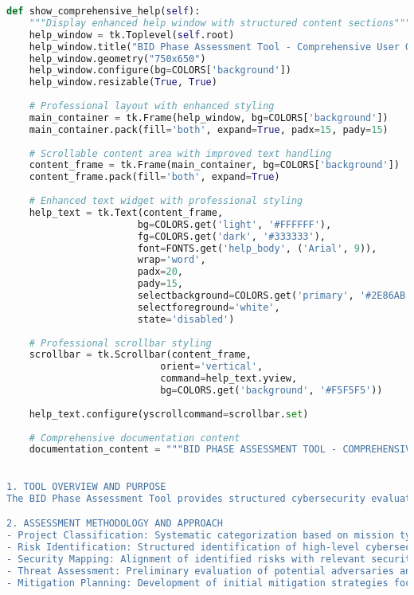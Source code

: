 \documentclass[binding=0.6cm]{sapthesis}
\begin{document}
\begin{lstlisting}[language=Python, caption=BID Tool Enhanced Help System Implementation]
def show_comprehensive_help(self):
    """Display enhanced help window with structured content sections"""
    help_window = tk.Toplevel(self.root)
    help_window.title("BID Phase Assessment Tool - Comprehensive User Guide")
    help_window.geometry("750x650")
    help_window.configure(bg=COLORS['background'])
    help_window.resizable(True, True)
    
    # Professional layout with enhanced styling
    main_container = tk.Frame(help_window, bg=COLORS['background'])
    main_container.pack(fill='both', expand=True, padx=15, pady=15)
    
    # Scrollable content area with improved text handling
    content_frame = tk.Frame(main_container, bg=COLORS['background'])
    content_frame.pack(fill='both', expand=True)
    
    # Enhanced text widget with professional styling
    help_text = tk.Text(content_frame,
                       bg=COLORS.get('light', '#FFFFFF'),
                       fg=COLORS.get('dark', '#333333'),
                       font=FONTS.get('help_body', ('Arial', 9)),
                       wrap='word',
                       padx=20,
                       pady=15,
                       selectbackground=COLORS.get('primary', '#2E86AB'),
                       selectforeground='white',
                       state='disabled')
    
    # Professional scrollbar styling
    scrollbar = tk.Scrollbar(content_frame,
                           orient='vertical',
                           command=help_text.yview,
                           bg=COLORS.get('background', '#F5F5F5'))
    
    help_text.configure(yscrollcommand=scrollbar.set)
    
    # Comprehensive documentation content
    documentation_content = """BID PHASE ASSESSMENT TOOL - COMPREHENSIVE USER GUIDE
    

1. TOOL OVERVIEW AND PURPOSE
The BID Phase Assessment Tool provides structured cybersecurity evaluation during the Business Initiation and Definition phase of space projects. It enables early identification of security risks and integration of cybersecurity considerations into project planning from the initial stages.

2. ASSESSMENT METHODOLOGY AND APPROACH  
- Project Classification: Systematic categorization based on mission type, complexity, and organizational context
- Risk Identification: Structured identification of high-level cybersecurity risks using expert-guided checklists
- Security Mapping: Alignment of identified risks with relevant security standards and regulatory requirements
- Threat Assessment: Preliminary evaluation of potential adversaries and attack vectors relevant to the project
- Mitigation Planning: Development of initial mitigation strategies focused on cost-effectiveness and feasibility


\end{lstlisting}
\end{document}
